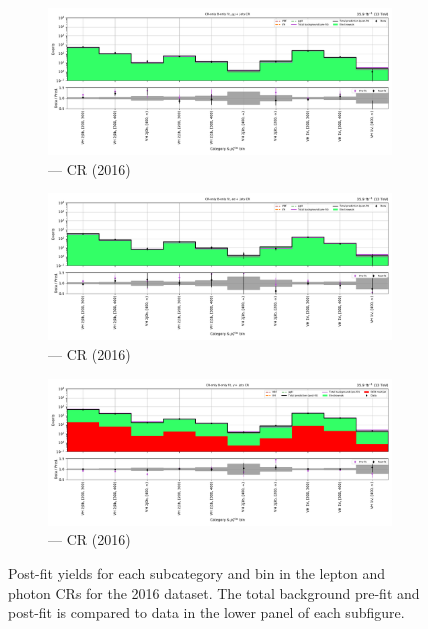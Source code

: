 \begin{figure}[htbp]
    \begin{subfigure}[b]{0.49\textwidth}
        \includegraphics[width=\textwidth]{chapters/higgstoinv/figures/mountain_ranges/2016/VH/Zmumu_tree_fit_b-abs_values_VH_cats.pdf}
        \caption{\VH --- \doubleMuCr \gls{CR} (2016)}
    \end{subfigure}
    \hfill
    \begin{subfigure}[b]{0.49\textwidth}
        \includegraphics[width=\textwidth]{chapters/higgstoinv/figures/mountain_ranges/2016/VH/Zee_tree_fit_b-abs_values_VH_cats.pdf}
        \caption{\VH --- \doubleEleCr \gls{CR} (2016)}
    \end{subfigure}

    \begin{subfigure}[b]{0.49\textwidth}
        \includegraphics[width=\textwidth]{chapters/higgstoinv/figures/mountain_ranges/2016/VH/Photon_tree_fit_b-abs_values_VH_cats.pdf}
        \caption{\VH --- \singlePhotonCr \gls{CR} (2016)}
    \end{subfigure}
    \caption[Post-fit yields for each \VH subcategory and \ptmiss bin in the lepton and photon control regions for the 2016 dataset]{Post-fit yields for each \VH subcategory and \ptmiss bin in the lepton and photon \glspl{CR} for the 2016 dataset. The total background pre-fit and post-fit is compared to data in the lower panel of each subfigure.}
    \label{fig:htoinv_mountain_range_VH_2016_CRs}
\end{figure}

